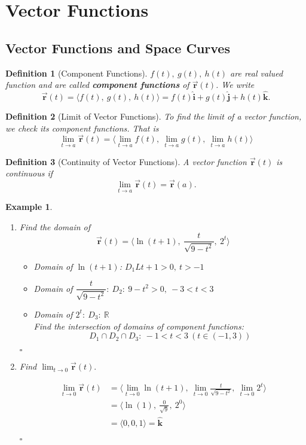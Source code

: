 \documentclass[12pt,a4paper]{article}
\newtheorem{df}{Definition}[subsection]
\newtheorem{eg}{Example}[subsection]
\newenvironment*{ans}{\par\indent{\textit{Answer. }}\par}{\par\hfill{$\square$}\par}
\def\R{{\mathbb{R}}}
\def\vecr{\vec{\boldsymbol{\textbf{r}}}}
\def\veci{\hat{\boldsymbol{\textbf{i}}}}
\def\vecj{\hat{\boldsymbol{\textbf{j}}}}
\def\veck{\hat{\boldsymbol{\textbf{k}}}}
\begin{document}
\newpage
\section{Vector Functions}
\subsection{Vector Functions and Space Curves}
\begin{df}[Component Functions]
	$f(t),\ g(t),\ h(t)$ are real valued function and are called \textbf{component functions} of $\vecr(t)$. We write \[\vecr(t)=\langle f(t),\ g(t),\ h(t)\rangle=f(t)\veci+g(t)\vecj+h(t)\veck.\]		
\end{df}
\begin{df}[Limit of Vector Functions]
	To find the limit of a vector function, we check its component functions. That is \[\lim_{t\to a}\vecr(t)=\Big\langle\lim_{t\to a}f(t),\ \lim_{t\to a}g(t),\ \lim_{t\to a}h(t)\Big\rangle\]	
\end{df}
\begin{df}[Continuity of Vector Functions]
	A vector function $\vecr(t)$ is continuous if \[\lim_{t\to a}\vecr(t)=\vecr(a).\]	
\end{df}
\begin{eg}
	\begin{enumerate}
		\item Find the domain of \[\vecr(t)=\Big\langle\ln(t+1),\ \frac{t}{\sqrt{9-t^2}},\ 2^t\Big\rangle\]
		\begin{ans}
			\begin{itemize}
				\item Domain of $\ln(t+1)$: $D_1L t+1>0,\ t>-1$
				\item Domain of $\dfrac{t}{\sqrt{9-t^2}}:\ D_2:\ 9-t^2>0,\ -3<t<3$
				\item Domain of $2^t:\ D_3:\ \R$\\
				Find the intersection of domains of component functions: \[D_1\cap D_2\cap D_3:\ -1<t<3\ (t\in(-1,3))\]
			\end{itemize}	
		\end{ans}
		\item Find $\displaystyle\lim_{t\to0}\vecr(t).$
		\begin{ans}
			\[\begin{aligned}
			\lim_{t\to0}\vecr(t)&=\Big\langle\lim_{t\to0}\ln(t+1),\ \lim_{t\to0}\frac{t}{\sqrt{9-t^2}},\ \lim_{t\to0}2^t\Big\rangle\\
			&=\big\langle\ln(1),\ \frac{0}{\sqrt{9}},\ 2^0\big\rangle\\
			&=\langle0,0,1\rangle=\veck
			\end{aligned}\]
		\end{ans}
	\end{enumerate}	
\end{eg}
\end{document}
